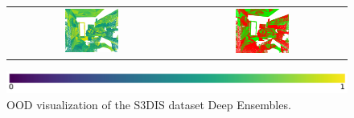 \begin{figure}[h!]
\begin{tabular}{cc}
                \includegraphics[width=0.33\textwidth, height=0.18\textheight]{images/ood_imgs/de_s3dis/ofc_42_de_prob.png}& 
                \includegraphics[width=0.33\textwidth, height=0.18\textheight]{images/ood_imgs/de_s3dis/de_prob_1.png}\\
            \end{tabular}
            \includegraphics[scale=0.45]{images/prob_legend.pdf}
            \caption{OOD visualization of the S3DIS dataset Deep Ensembles.}
            \label{fig:de_s3dis_oodmap_prob}
        \end{figure}
